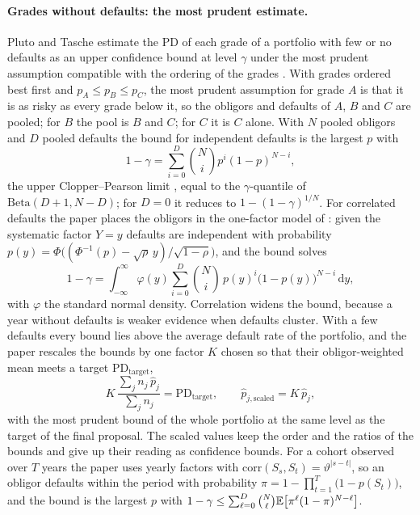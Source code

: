 \paragraph{Grades without defaults: the most prudent estimate.} Pluto and Tasche estimate the PD of each grade of a portfolio with few or no defaults as an upper confidence bound at level $\gamma$ under the most prudent assumption compatible with the ordering of the grades \citep{ratings:plutotasche2006}. With grades ordered best first and $p_A\le p_B\le p_C$, the most prudent assumption for grade $A$ is that it is as risky as every grade below it, so the obligors and defaults of $A$, $B$ and $C$ are pooled; for $B$ the pool is $B$ and $C$; for $C$ it is $C$ alone. With $N$ pooled obligors and $D$ pooled defaults the bound for independent defaults is the largest $p$ with
\begin{equation}
1-\gamma = \sum_{i=0}^{D}\binom{N}{i}p^{i}(1-p)^{N-i},
\label{eq:ratings-clopper}
\end{equation}
the upper Clopper--Pearson limit \citep{ratings:clopper1934}, equal to the $\gamma$-quantile of $\mathrm{Beta}(D+1,N-D)$; for $D = 0$ it reduces to $1-(1-\gamma)^{1/N}$. For correlated defaults the paper places the obligors in the one-factor model of : given the systematic factor $Y=y$ defaults are independent with probability $p(y)=\Phi\bigl((\Phi^{-1}(p)-\sqrt{\rho}\,y)/\sqrt{1-\rho}\bigr)$, and the bound solves
\begin{equation}
1-\gamma = \int_{-\infty}^{\infty}\varphi(y)\sum_{i=0}^{D}\binom{N}{i}\,p(y)^{i}\bigl(1-p(y)\bigr)^{N-i}\,\mathrm{d}y,
\label{eq:ratings-correlated}
\end{equation}
with $\varphi$ the standard normal density. Correlation widens the bound, because a year without defaults is weaker evidence when defaults cluster. With a few defaults every bound lies above the average default rate of the portfolio, and the paper rescales the bounds by one factor $K$ chosen so that their obligor-weighted mean meets a target $\mathrm{PD}_{\text{target}}$,
\begin{equation}
K\,\frac{\sum_j n_j\,\hat p_j}{\sum_j n_j} = \mathrm{PD}_{\text{target}},\qquad \hat p_{j,\text{scaled}} = K\,\hat p_j,
\label{eq:ratings-scaling}
\end{equation}
with the most prudent bound of the whole portfolio at the same level as the target of the final proposal. The scaled values keep the order and the ratios of the bounds and give up their reading as confidence bounds. For a cohort observed over $T$ years the paper uses yearly factors with $\mathrm{corr}(S_s,S_t)=\vartheta^{|s-t|}$, so an obligor defaults within the period with probability $\pi = 1-\prod_{t=1}^{T}\bigl(1-p(S_t)\bigr)$, and the bound is the largest $p$ with $1-\gamma \le \sum_{\ell=0}^{D}\binom{N}{\ell}\mathbb{E}\bigl[\pi^{\ell}(1-\pi)^{N-\ell}\bigr]$.

